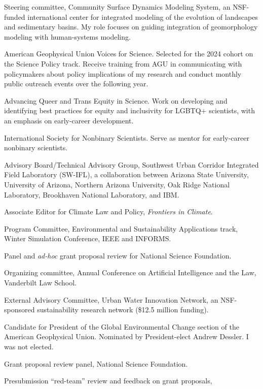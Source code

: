 \item[2024--2027] Steering committee, Community Surface Dynamics Modeling System, an NSF-funded international center for integrated modeling of
the evolution of landscapes and sedimentary basins. My role focuses on guiding
integration of geomorphology modeling with human-systems modeling.
\item[2024--2025] American Geophysical Union Voices for Science. Selected for
  the 2024 cohort on the Science Policy track. Receive training from AGU in
  communicating with policymakers about policy implications of my research and
  conduct monthly public outreach events over the following year.
\item[2024--present] Advancing Queer and Trans Equity in Science. 
  Work on developing and identifying best practices for equity and 
  inclusivity for LGBTQ+ scientists, with an emphasis on early-career development.
\item[2023--present] International Society for Nonbinary Scientists. 
  Serve as mentor for early-career nonbinary scientists.
\item[2023--2025] Advisory Board/Technical Advisory Group,
  Southwest Urban Corridor Integrated Field Laboratory (SW-IFL),
  a collaboration between Arizona State University, University of Arizona,
  Northern Arizona University, Oak Ridge National Laboratory,
  Brookhaven National Laboratory, and IBM.
\item[2021--present] Associate Editor for Climate Law and Policy,
   \emph{Frontiers in Climate}.
\item[2016--present] Program Committee,
  Environmental and Sustainability Applications track,
  Winter Simulation Conference, IEEE and INFORMS.
\item[2023] Panel and \emph{ad-hoc\/} grant proposal review for National Science Foundation.
\item[2016--2022] Organizing committee,
  Annual Conference on Artificial Intelligence and the Law,
  Vanderbilt Law School.
\item[2016--2021] External Advisory Committee,
  Urban Water Innovation Network, an NSF-sponsored sustainability
  research network (\$12.5 million funding).
\item[2022] Candidate for President of the Global Environmental Change
  section of the American Geophysical Union. Nominated by President-elect
  Andrew Dessler. I was not elected.
\item[2022] Grant proposal review panel, National Science Foundation.
\item[2022] Presubmission ``red-team'' review and feedback on grant proposals,
